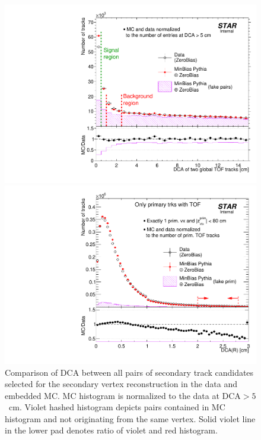 

\begin{figure}[b!]\vspace{-2pt}%
\centering%
\begin{minipage}{.4725\textwidth}%
  \centering%
  \includegraphics[width=\linewidth]{graphics/deadMaterial/DcaOfTwoGlobalTofTrksWithLargeD0_DataVsMC.pdf}\vspace{-5pt}%
  \caption[Comparison of DCA between all pairs of secondary track candidates selected for the secondary vertex reconstruction in the data and embedded MC.]%
  {Comparison of DCA between all pairs of secondary track candidates selected for the secondary vertex reconstruction  in the data and embedded MC. MC histogram is normalized to the data at $\text{DCA}>5$~cm. Violet hashed histogram depicts pairs contained in MC histogram and not originating from the same vertex. Solid violet line in the lower pad denotes ratio of violet and red histogram.\newline }\label{fig:DcaOfTwoGlobalTofTrksWithLargeD0_DataVsMC}
\end{minipage}%
\quad\quad%
\begin{minipage}{.4725\textwidth}%
  \centering%
  \includegraphics[width=\linewidth]{graphics/deadMaterial/DcaRPrimary_Tof_SelectedEvents_DataVsMC.pdf}\vspace*{-5pt}

\end{minipage}
\end{figure}
